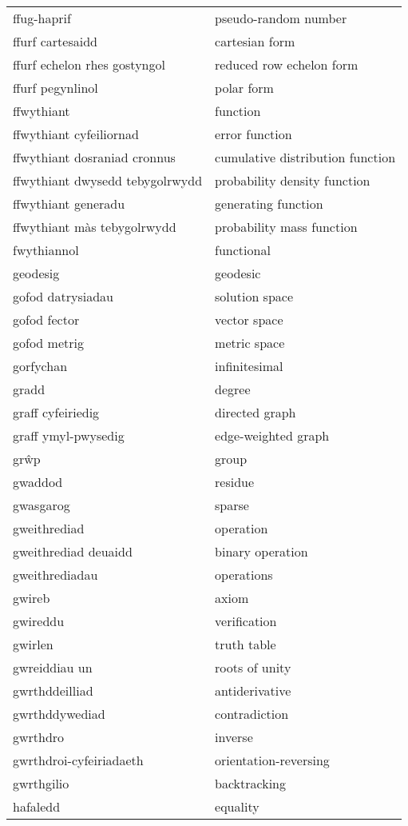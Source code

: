 \begin{supertabular}{p{0.22\textwidth}p{0.22\textwidth}}
ffug-haprif & pseudo-random number \\
ffurf cartesaidd & cartesian form \\
ffurf echelon rhes gostyngol & reduced row echelon form \\
ffurf pegynlinol & polar form \\
ffwythiant & function \\
ffwythiant cyfeiliornad & error function \\
ffwythiant dosraniad cronnus & cumulative distribution function \\
ffwythiant dwysedd tebygolrwydd & probability density function \\
ffwythiant generadu & generating function \\
ffwythiant màs tebygolrwydd & probability mass function \\
fwythiannol & functional \\
geodesig & geodesic \\
gofod datrysiadau & solution space \\
gofod fector & vector space \\
gofod metrig & metric space \\
gorfychan & infinitesimal \\
gradd & degree \\
graff cyfeiriedig & directed graph \\
graff ymyl-pwysedig & edge-weighted graph \\
grŵp & group \\
gwaddod & residue \\
gwasgarog & sparse \\
gweithrediad & operation \\
gweithrediad deuaidd & binary operation \\
gweithrediadau & operations \\
gwireb & axiom \\
gwireddu & verification \\
gwirlen & truth table \\
gwreiddiau un & roots of unity \\
gwrthddeilliad & antiderivative \\
gwrthddywediad & contradiction \\
gwrthdro & inverse \\
gwrthdroi-cyfeiriadaeth & orientation-reversing \\
gwrthgilio & backtracking \\
hafaledd & equality \\

\end{supertabular}
